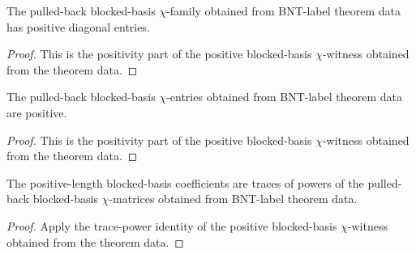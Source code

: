 \begin{theorem}%
    \label{thm:mpdo_bnt_label_theorem_data_positive_blocked_chi_pos_entries}
    \leanok
    The pulled-back blocked-basis $\chi$-family obtained from BNT-label
    theorem data has positive diagonal entries.
\end{theorem}
\begin{proof}\leanok
    This is the positivity part of the positive blocked-basis
    $\chi$-witness obtained from the theorem data.
\end{proof}

\begin{theorem}%
    \label{thm:mpdo_bnt_label_theorem_data_positive_blocked_chi_entry_pos}
    \leanok
    The pulled-back blocked-basis $\chi$-entries obtained from BNT-label
    theorem data are positive.
\end{theorem}
\begin{proof}\leanok
    This is the positivity part of the positive blocked-basis
    $\chi$-witness obtained from the theorem data.
\end{proof}

\begin{theorem}%
    \label{thm:mpdo_bnt_label_theorem_data_blocked_coeff_eq_positive_blocked_chi_trace_pow}
    \leanok
    The positive-length blocked-basis coefficients are traces of powers of the
    pulled-back blocked-basis $\chi$-matrices obtained from BNT-label
    theorem data.
\end{theorem}
\begin{proof}\leanok
    Apply the trace-power identity of the positive blocked-basis
    $\chi$-witness obtained from the theorem data.
\end{proof}

